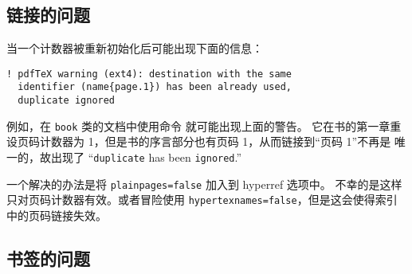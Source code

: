 \subsection{链接的问题}


当一个计数器被重新初始化后可能出现下面的信息：
\begin{verbatim}
! pdfTeX warning (ext4): destination with the same
  identifier (name{page.1}) has been already used,
  duplicate ignored
\end{verbatim}
例如，在 \texttt{book} 类的文档中使用命令  就可能出现上面的警告。
它在书的第一章重设页码计数器为 1，但是书的序言部分也有页码 1，从而链接到“页码 1”不再是
唯一的，故出现了 ``\verb+duplicate+ has been \verb+ignored+.''


一个解决的办法是将 \texttt{plainpages=false} 加入到 hyperref 选项中。
不幸的是这样只对页码计数器有效。或者冒险使用
\texttt{hypertexnames=false}，但是这会使得索引中的页码链接失效。

\subsection{书签的问题}

